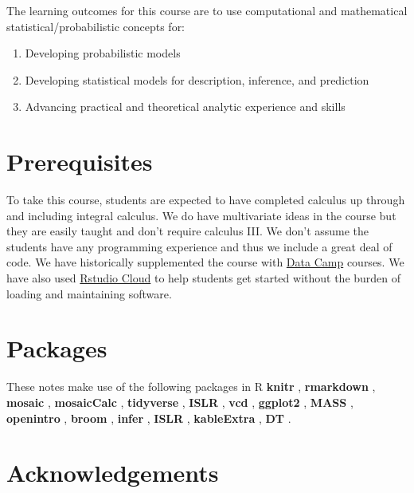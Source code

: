 \documentclass[
]{book}
\providecommand{\tightlist}{%
  \setlength{\itemsep}{0pt}\setlength{\parskip}{0pt}}
\begin{document}
The learning outcomes for this course are to use computational and mathematical statistical/probabilistic concepts for:

\begin{enumerate}
\def\labelenumi{\alph{enumi}.}
\tightlist
\item
  Developing probabilistic models
\item
  Developing statistical models for description, inference, and prediction\\
\item
  Advancing practical and theoretical analytic experience and skills
\end{enumerate}

\hypertarget{prerequisites}{%
\section{Prerequisites}\label{prerequisites}}

To take this course, students are expected to have completed calculus up through and including integral calculus. We do have multivariate ideas in the course but they are easily taught and don't require calculus III. We don't assume the students have any programming experience and thus we include a great deal of code. We have historically supplemented the course with \href{http://datacamp.com/}{Data Camp} courses. We have also used \href{http://rstudio.cloud}{Rstudio Cloud} to help students get started without the burden of loading and maintaining software.

\hypertarget{packages}{%
\section{Packages}\label{packages}}

These notes make use of the following packages in R \textbf{knitr} \citep{R-knitr}, \textbf{rmarkdown} \citep{R-rmarkdown}, \textbf{mosaic} \citep{R-mosaic}, \textbf{mosaicCalc} \citep{R-mosaicCalc}, \textbf{tidyverse} \citep{R-tidyverse}, \textbf{ISLR} \citep{R-ISLR}, \textbf{vcd} \citep{R-vcd}, \textbf{ggplot2} \citep{R-ggplot2}, \textbf{MASS} \citep{R-MASS}, \textbf{openintro} \citep{R-openintro}, \textbf{broom} \citep{R-broom}, \textbf{infer} \citep{R-infer}, \textbf{ISLR} \citep{R-ISLR}, \textbf{kableExtra} \citep{R-kableExtra}, \textbf{DT} \citep{R-DT}.

\hypertarget{acknowledgements}{%
\section{Acknowledgements}\label{acknowledgements}}
\end{document}
